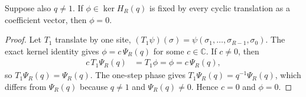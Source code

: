 \begin{lemma}
    \label{lem:pvbs_matching_volume_no_fixed_ground_vector}
    \leanok
    Suppose also $q\ne1$. If $\phi\in\ker H_R(q)$ is fixed by every cyclic
    translation as a coefficient vector, then $\phi=0$.
\end{lemma}
\begin{proof}
    \leanok
    Let $T_1$ translate by one site,
    $(T_1\psi)(\sigma)=\psi(\sigma_1,\ldots,\sigma_{R-1},\sigma_0)$.
    The exact kernel identity gives $\phi=c\,\Psi_R(q)$ for some
    $c\in\mathbb C$. If $c\ne0$, then
    \begin{align}
        c\,T_1\Psi_R(q) & =T_1\phi=\phi=c\,\Psi_R(q),
        \label{eq:pvbs_matching_volume_fixed_cancel}
    \end{align}
    so $T_1\Psi_R(q)=\Psi_R(q)$. The one-step phase gives
    $T_1\Psi_R(q)=q^{-1}\Psi_R(q)$, which differs from $\Psi_R(q)$
    because $q\ne1$ and $\Psi_R(q)\ne0$. Hence $c=0$ and $\phi=0$.
\end{proof}
